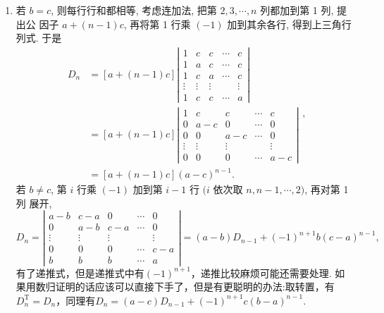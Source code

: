 \begin{enumerate}
    \item 若 $b=c$, 则每行行和都相等, 考虑连加法, 把第 $2,3, \cdots, n$ 列都加到第 1 列, 提出公 因子 $a+(n-1) c$, 再将第 1 行乘 $(-1)$ 加到其余各行, 得到上三角行列式. 于是
    \[\begin{aligned}
    D_{n} &=[a+(n-1) c]\left|\begin{array}{ccccc}
    1 & c & c & \cdots & c \\
    1 & a & c & \cdots & c \\
    1 & c & a & \cdots & c \\
    \vdots & \vdots & \vdots & & \vdots \\
    1 & c & c & \cdots & a
    \end{array}\right| \\
    &=[a+(n-1) c]\left|\begin{array}{ccccc}
    1 & c & c & \cdots & c \\
    0 & a-c & 0 & \cdots & 0 \\
    0 & 0 & a-c & \cdots & 0 \\
    \vdots & \vdots & \vdots & & \vdots \\
    0 & 0 & 0 & \cdots & a-c
    \end{array}\right| \\
    &=[a+(n-1) c](a-c)^{n-1} .
    \end{aligned},\]
    若 $b \neq c$, 第 $i$ 行乘 $(-1)$ 加到第 $i-1$ 行 $(i$ 依次取 $n, n-1, \cdots, 2)$, 再对第 1 列 展开,
    \[D_{n}=\left|\begin{array}{ccccc}
    a-b & c-a & 0 & \cdots & 0 \\
    0 & a-b & c-a & \cdots & 0 \\
    \vdots & \vdots & \vdots & & \vdots \\
    0 & 0 & 0 & \cdots & c-a \\
    b & b & b & \cdots & a
    \end{array}\right|=(a-b)D_{n-1}+(-1)^{n+1}b(c-a)^{n-1},\]
    有了递推式，但是递推式中有$(-1)^{n+1}$，递推比较麻烦可能还需要处理. 如果用数归证明的话应该可以直接下手了，但是有更聪明的办法:取转置，有$D_n^\mathrm{T}=D_n$，同理有$D_n=(a-c)D_{n-1}+(-1)^{n+1}c(b-a)^{n-1}$.
\end{enumerate}

